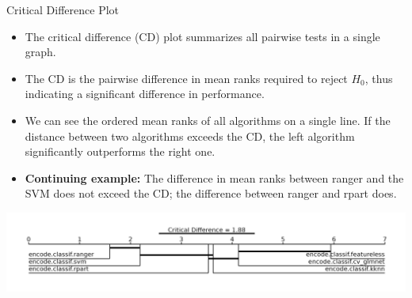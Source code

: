 \documentclass[11pt,compress,t,notes=noshow, aspectratio=169, xcolor=table]{beamer}
\begin{document}
\begin{frame}{Critical Difference Plot}

\begin{itemize}
    \itemsep1em
    \item The critical difference (CD) plot summarizes all pairwise tests in a single graph.
    \item The CD is the pairwise difference in mean ranks required to reject $H_0$, thus indicating a significant difference in performance.
    \item We can see the ordered mean ranks of all algorithms on a single line. If the distance between two algorithms exceeds the CD, the left algorithm significantly outperforms the right one.
    \item \textbf{Continuing example:} The difference in mean ranks between ranger and the SVM does not exceed the CD; the difference between ranger and rpart does.
\end{itemize}
\includegraphics[width = 1.3\textwidth]{figure/crit_diff_plot.png}
\end{frame}
\end{document}
